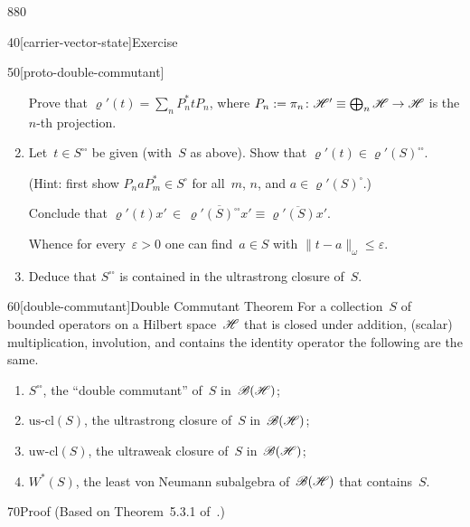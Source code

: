 \begin{parsec}{880}
\begin{point}{40}[carrier-vector-state]{Exercise}
\begin{point}{50}[proto-double-commutant]
\begin{enumerate}
Prove that $\varrho'(t)=\sum_n P_n^* t P_n$,
where $P_n:=\pi_n\colon \mathscr{H}'\equiv \bigoplus_n\mathscr{H}\to\mathscr{H}$
is the $n$-th projection.
\item

Let~$t\in S^{\square\square}$ be given
(with~$S$ as above).
Show that $\varrho'(t)\in \varrho'(S)^{\square\square}$.

(Hint: first show 
	$P_n aP_m^*\in S^\square$ for all~$m$, $n$, and
		$a\in \varrho'(S)^\square$.)

Conclude that  $\varrho'(t)x'\,\in\,\overline{\varrho'(S)^{\square\square}x'}
\equiv \overline{\varrho'(S)x'}$.

Whence for every~$\varepsilon>0$
one can find~$a\in S$ with $\|t-a\|_\omega \leq \varepsilon$.

\item
Deduce that $S^{\square\square}$
is contained in the ultrastrong closure of~$S$.
\end{enumerate}
\end{point}
\end{point}
\begin{point}{60}[double-commutant]{Double Commutant Theorem}%
%
For a collection~$S$ of bounded operators
on a Hilbert space~$\mathscr{H}$
that is closed under addition, (scalar) multiplication,
involution, and contains the identity operator
the following are the same.
\begin{enumerate}
\item
$S^{\square\square}$, the ``double commutant'' of~$S$
in~$\mathscr{B}(\mathscr{H})$;
\item
$\mathrm{us}\text{-}\mathrm{cl}(S)$,
the ultrastrong closure of~$S$ in~$\mathscr{B}(\mathscr{H})$;
\item
$\mathrm{uw}\text{-}\mathrm{cl}(S)$,
the ultraweak closure of~$S$ in~$\mathscr{B}(\mathscr{H})$;
\item
$W^*(S)$,
the least von Neumann subalgebra of~$\mathscr{B}(\mathscr{H})$
that contains~$S$.
\end{enumerate}
\begin{point}{70}{Proof}%
(Based on Theorem~5.3.1 of~\cite{kr}.) 


\end{point}
\end{point}
\end{parsec}

